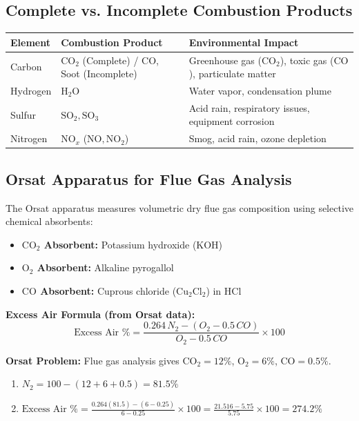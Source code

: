 \documentclass[12pt,a4paper]{article}
\begin{document}
\subsection{Complete vs. Incomplete Combustion Products}
\begin{center}
\renewcommand{\arraystretch}{1.4}
\begin{tabular}{|l|l|p{6.5cm}|}
\hline
\textbf{Element} & \textbf{Combustion Product} & \textbf{Environmental Impact} \\
\hline
Carbon & $\text{CO}_2$ (Complete) / $\text{CO}$, Soot (Incomplete) & Greenhouse gas ($\text{CO}_2$), toxic gas ($\text{CO}$), particulate matter \\
\hline
Hydrogen & $\text{H}_2\text{O}$ & Water vapor, condensation plume \\
\hline
Sulfur & $\text{SO}_2, \text{SO}_3$ & Acid rain, respiratory issues, equipment corrosion \\
\hline
Nitrogen & $\text{NO}_x$ ($\text{NO}, \text{NO}_2$) & Smog, acid rain, ozone depletion \\
\hline
\end{tabular}
\end{center}

\subsection{Orsat Apparatus for Flue Gas Analysis}
The Orsat apparatus measures volumetric dry flue gas composition using selective chemical absorbents:
\begin{itemize}
    \item \textbf{$\text{CO}_2$ Absorbent:} Potassium hydroxide (KOH)
    \item \textbf{$\text{O}_2$ Absorbent:} Alkaline pyrogallol
    \item \textbf{$\text{CO}$ Absorbent:} Cuprous chloride ($\text{Cu}_2\text{Cl}_2$) in HCl
\end{itemize}

\textbf{Excess Air Formula (from Orsat data):}
\[ \text{Excess Air \%} = \frac{0.264\,N_2 - (O_2 - 0.5\,CO)}{O_2 - 0.5\,CO} \times 100 \]

\begin{example}
\textbf{Orsat Problem:} Flue gas analysis gives $\text{CO}_2 = 12\%$, $\text{O}_2 = 6\%$, $\text{CO} = 0.5\%$.
\begin{enumerate}
    \item $N_2 = 100 - (12 + 6 + 0.5) = 81.5\%$
    \item $\text{Excess Air \%} = \frac{0.264(81.5) - (6 - 0.25)}{6 - 0.25} \times 100 = \frac{21.516 - 5.75}{5.75} \times 100 = 274.2\%$
\end{enumerate}
\end{example}
\end{document}
